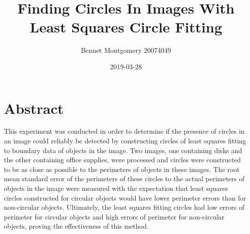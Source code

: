 \documentclass{article}
\title{Finding Circles In Images With Least Squares Circle Fitting}
\author{Bennet Montgomery 20074049}
\date{2019-03-28}
\begin{document}
	\maketitle
	
	\section*{Abstract}
	This experiment was conducted in order to determine if the presence of circles in an image could reliably be detected by constructing circles of least squares fitting to boundary data of objects in the image. Two images, one containing disks and the other containing office supplies, were processed and circles were constructed to be as close as possible to the perimeters of objects in these images. The root mean standard error of the perimeters of these circles to the actual perimeters of objects in the image were measured with the expectation that least squares circles constructed for circular objects would have lower perimeter errors than for non-circular objects. Ultimately, the least squares fitting circles had low errors of perimeter for circular objects and high errors of perimeter for non-circular objects, proving the effectiveness of this method. 
\end{document}
